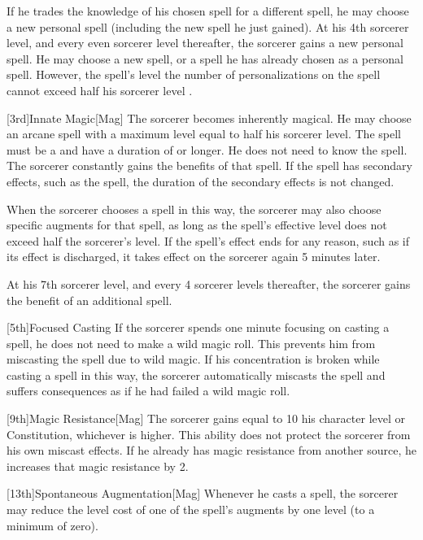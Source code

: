         If he trades the knowledge of his chosen spell for a different spell, he may choose a new personal spell (including the new spell he just gained).
        At his 4th sorcerer level, and every even sorcerer level thereafter, the sorcerer gains a new personal spell.
        He may choose a new spell, or a spell he has already chosen as a personal spell.
        However, the spell's level \add the number of personalizations on the spell cannot exceed half his sorcerer level .

        [3rd]{Innate Magic}[Mag]
        The sorcerer becomes inherently magical.
        He may choose an arcane spell with a maximum level equal to half his sorcerer level.
        The spell must be a  and have a duration of \durshort or longer.
        He does not need to know the spell.
        The sorcerer constantly gains the benefits of that spell.
        If the spell has secondary effects, such as the  spell, the duration of the secondary effects is not changed.

        When the sorcerer chooses a spell in this way, the sorcerer may also choose specific augments for that spell, as long as the spell's effective level does not exceed half the sorcerer's level.
        If the spell's effect ends for any reason, such as if its effect is discharged, it takes effect on the sorcerer again 5 minutes later.

        At his 7th sorcerer level, and every 4 sorcerer levels thereafter, the sorcerer gains the benefit of an additional spell.

        [5th]{Focused Casting}
        If the sorcerer spends one minute focusing on casting a spell, he does not need to make a wild magic roll.
        This prevents him from miscasting the spell due to wild magic.
        If his concentration is broken while casting a spell in this way, the sorcerer automatically miscasts the spell and suffers consequences as if he had failed a wild magic roll.

        [9th]{Magic Resistance}[Mag]
        The sorcerer gains  equal to 10 \add his character level or Constitution, whichever is higher.
        This ability does not protect the sorcerer from his own miscast effects.
        If he already has magic resistance from another source, he increases that magic resistance by 2.

        [13th]{Spontaneous Augmentation}[Mag]
        Whenever he casts a spell, the sorcerer may reduce the level cost of one of the spell's augments by one level (to a minimum of zero).

